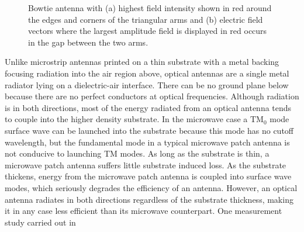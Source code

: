 \documentclass[11pt]{article}
\begin{document}
\begin{figure}[t!]
  \centering
   \hfil
   \hfil
  \caption{Bowtie antenna with (a) highest field intensity shown in red around the edges and corners of the triangular arms and (b) electric field vectors where the largest amplitude field is displayed in red occurs in the gap between the two arms.}
  \label{fig:s_bowtie}
\end{figure}
%
Unlike microstrip antennas printed on a thin substrate with a metal backing focusing radiation into the air region above, optical antennas are a single metal radiator lying on a dielectric-air interface. There can be no ground plane below because there are no perfect conductors at optical frequencies. Although radiation is in both directions, most of the energy radiated from an optical antenna tends to couple into the higher density substrate. In the microwave case a $\text{TM}_0$ mode surface wave can be launched into the substrate because this mode has no cutoff wavelength, but the fundamental mode in a typical microwave patch antenna is not conducive to launching TM modes. As long as the substrate is thin, a microwave patch antenna suffers little substrate induced loss. As the substrate thickens, energy from the microwave patch antenna is coupled into surface wave modes, which seriously degrades the efficiency of an antenna. However, an optical antenna radiates in both directions regardless of the substrate thickness, making it in any case less efficient than its microwave counterpart. One measurement study carried out in
\end{document}

